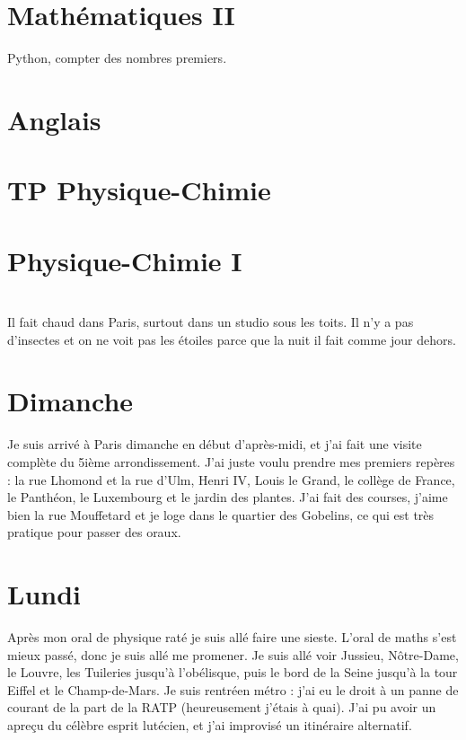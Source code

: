 \documentclass[french,a4paper, 12pt]{article}
\begin{document}
\section*{Mathématiques II}
Python, compter des nombres premiers.
\section*{Anglais}
\section*{TP Physique-Chimie}
\section*{Physique-Chimie I}

\section*{}

Il fait chaud dans Paris, surtout dans un studio sous les toits. Il n'y a pas d'insectes et on ne voit pas les étoiles parce que la nuit il fait comme jour dehors.

\section*{Dimanche}

Je suis arrivé à Paris dimanche en début d'après-midi, et j'ai fait une visite complète du 5ième arrondissement. J'ai juste voulu prendre mes premiers repères : la rue Lhomond et la rue d'Ulm, Henri IV, Louis le Grand, le collège de France, le Panthéon, le Luxembourg et le jardin des plantes. J'ai fait des courses, j'aime bien la rue Mouffetard et je loge dans le quartier des Gobelins, ce qui est très pratique pour passer des oraux.

\section*{Lundi}

Après mon oral de physique raté je suis allé faire une sieste. L'oral de maths s'est mieux passé, donc je suis allé me promener. Je suis allé voir Jussieu, Nôtre-Dame, le Louvre, les Tuileries jusqu'à l'obélisque, puis le bord de la Seine jusqu'à la tour Eiffel et le Champ-de-Mars. Je suis rentréen métro : j'ai eu le droit à un panne de courant de la part de la RATP (heureusement j'étais à quai). J'ai pu avoir un apreçu du célèbre esprit lutécien, et j'ai improvisé un itinéraire alternatif.
\end{document}
